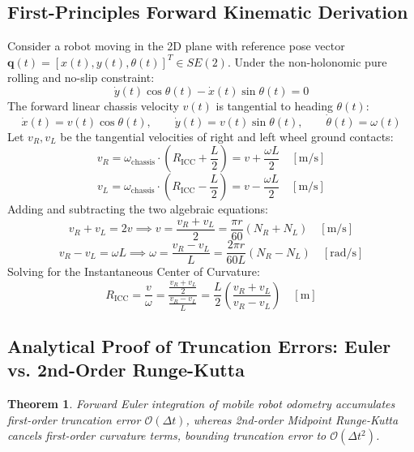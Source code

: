 \documentclass[11pt, a4paper]{article}
\newtheorem{theorem}{Theorem}[section]
\begin{document}
\subsection{First-Principles Forward Kinematic Derivation}
Consider a robot moving in the 2D plane with reference pose vector $\mathbf{q}(t) = [x(t), y(t), \theta(t)]^T \in SE(2)$. Under the non-holonomic pure rolling and no-slip constraint:
\begin{equation}
    \dot{y}(t) \cos\theta(t) - \dot{x}(t) \sin\theta(t) = 0
\end{equation}
The forward linear chassis velocity $v(t)$ is tangential to heading $\theta(t)$:
\begin{equation}
    \dot{x}(t) = v(t) \cos\theta(t), \qquad \dot{y}(t) = v(t) \sin\theta(t), \qquad \dot{\theta}(t) = \omega(t)
\end{equation}
Let $v_R, v_L$ be the tangential velocities of right and left wheel ground contacts:
\begin{equation}
    v_R = \omega_{\text{chassis}} \cdot \left(R_{\text{ICC}} + \frac{L}{2}\right) = v + \frac{\omega L}{2} \quad [\text{m/s}]
\end{equation}
\begin{equation}
    v_L = \omega_{\text{chassis}} \cdot \left(R_{\text{ICC}} - \frac{L}{2}\right) = v - \frac{\omega L}{2} \quad [\text{m/s}]
\end{equation}
Adding and subtracting the two algebraic equations:
\begin{equation}
    v_R + v_L = 2v \implies v = \frac{v_R + v_L}{2} = \frac{\pi r}{60} (N_R + N_L) \quad [\text{m/s}]
\end{equation}
\begin{equation}
    v_R - v_L = \omega L \implies \omega = \frac{v_R - v_L}{L} = \frac{2\pi r}{60 L} (N_R - N_L) \quad [\text{rad/s}]
\end{equation}
Solving for the Instantaneous Center of Curvature:
\begin{equation}
    R_{\text{ICC}} = \frac{v}{\omega} = \frac{\frac{v_R + v_L}{2}}{\frac{v_R - v_L}{L}} = \frac{L}{2} \left(\frac{v_R + v_L}{v_R - v_L}\right) \quad [\text{m}]
\end{equation}

\subsection{Analytical Proof of Truncation Errors: Euler vs. 2nd-Order Runge-Kutta}
\begin{theorem}
Forward Euler integration of mobile robot odometry accumulates first-order truncation error $\mathcal{O}(\Delta t)$, whereas 2nd-order Midpoint Runge-Kutta cancels first-order curvature terms, bounding truncation error to $\mathcal{O}(\Delta t^2)$.
\end{theorem}
\end{document}
